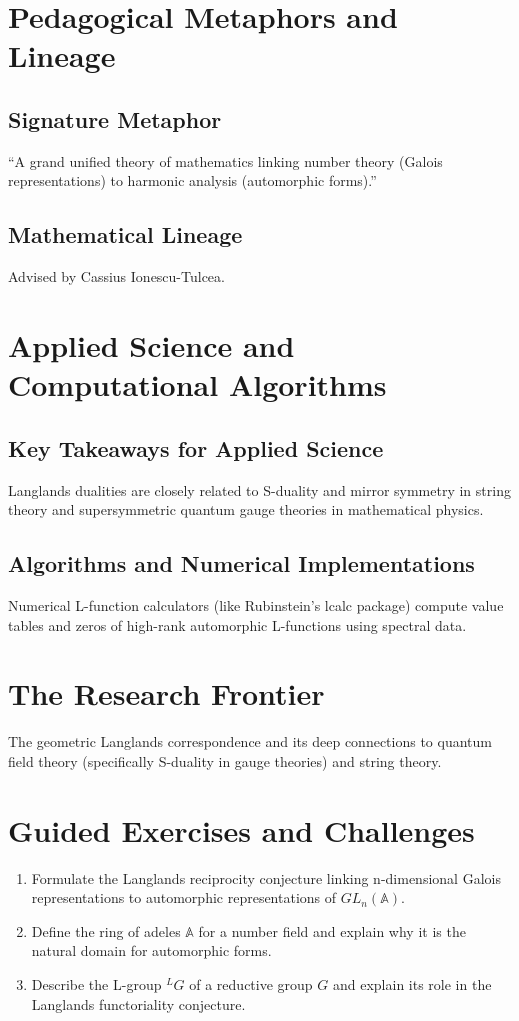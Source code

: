 \section{Pedagogical Metaphors and Lineage}
\subsection{Signature Metaphor}
``A grand unified theory of mathematics linking number theory (Galois representations) to harmonic analysis (automorphic forms).''

\subsection{Mathematical Lineage}
Advised by Cassius Ionescu-Tulcea.

\section{Applied Science and Computational Algorithms}
\subsection{Key Takeaways for Applied Science}
Langlands dualities are closely related to S-duality and mirror symmetry in string theory and supersymmetric quantum gauge theories in mathematical physics.

\subsection{Algorithms and Numerical Implementations}
Numerical L-function calculators (like Rubinstein's lcalc package) compute value tables and zeros of high-rank automorphic L-functions using spectral data.

\section{The Research Frontier}
The geometric Langlands correspondence and its deep connections to quantum field theory (specifically S-duality in gauge theories) and string theory.

\section{Guided Exercises and Challenges}
\begin{enumerate}[label=\textbf{\arabic*.}]
  \item Formulate the Langlands reciprocity conjecture linking n-dimensional Galois representations to automorphic representations of $GL_n(\mathbb{A})$.
  \item Define the ring of adeles $\mathbb{A}$ for a number field and explain why it is the natural domain for automorphic forms.
  \item Describe the L-group $^LG$ of a reductive group $G$ and explain its role in the Langlands functoriality conjecture.
\end{enumerate}

